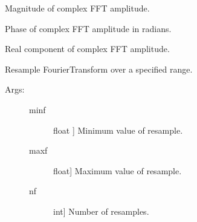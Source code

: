 \documentclass[letterpaper,10pt,english]{sphinxmanual}
\begin{document}
\begin{fulllineitems}

\begin{fulllineitems}
\label{\detokenize{index:sigpropy.FourierTransform.mag}}
Magnitude of complex FFT amplitude.

\end{fulllineitems}


\begin{fulllineitems}
\label{\detokenize{index:sigpropy.FourierTransform.phase}}
Phase of complex FFT amplitude in radians.

\end{fulllineitems}


\begin{fulllineitems}
\label{\detokenize{index:sigpropy.FourierTransform.real}}
Real component of complex FFT amplitude.

\end{fulllineitems}


\begin{fulllineitems}
\label{\detokenize{index:sigpropy.FourierTransform.resample}}
Resample FourierTransform over a specified range.
\begin{description}
\item[{Args:}] \leavevmode\begin{description}
\item[{minf}] \leavevmode{[}float {]}
Minimum value of resample.

\item[{maxf}] \leavevmode{[}float{]}
Maximum value of resample.

\item[{nf}] \leavevmode{[}int{]}
Number of resamples.


\end{description}
\end{description}
\end{fulllineitems}
\end{fulllineitems}
\end{document}
